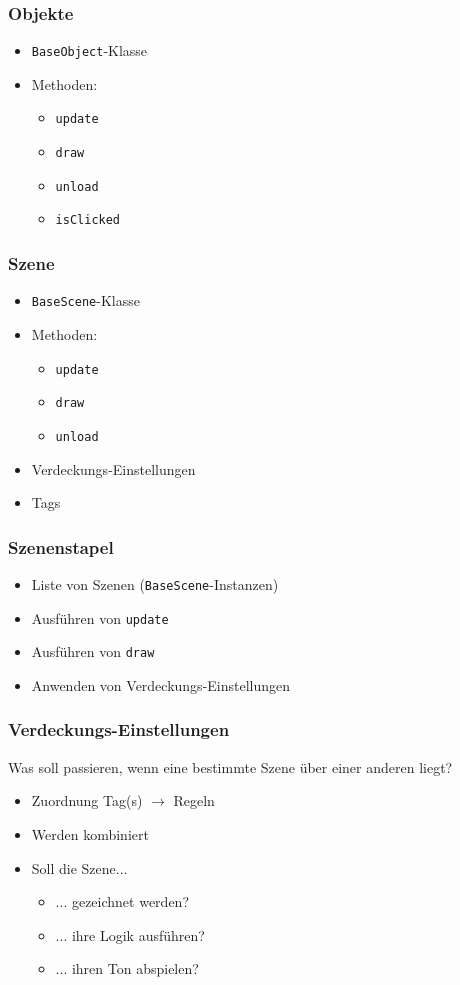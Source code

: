 \begin{frame}
	\frametitle{Objekte}
	\begin{itemize}
		\item \texttt{BaseObject}-Klasse
		\item Methoden:
		\begin{itemize}
			\item \texttt{update}
			\item \texttt{draw}
			\item \texttt{unload}
			\item \texttt{isClicked}
		\end{itemize}
	\end{itemize}
\end{frame}

\begin{frame}
	\frametitle{Szene}
	\begin{itemize}
		\item \texttt{BaseScene}-Klasse
		\item Methoden:
		\begin{itemize}
			\item \texttt{update}
			\item \texttt{draw}
			\item \texttt{unload}
		\end{itemize}
		\item Verdeckungs-Einstellungen
		\item Tags
	\end{itemize}
\end{frame}

\begin{frame}
	\frametitle{Szenenstapel}
	\begin{itemize}
		\item Liste von Szenen (\texttt{BaseScene}-Instanzen)
		\item Ausführen von \texttt{update}
		\item Ausführen von \texttt{draw}
		\item Anwenden von Verdeckungs-Einstellungen
	\end{itemize}
\end{frame}

\begin{frame}
	\frametitle{Verdeckungs-Einstellungen}
	Was soll passieren, wenn eine bestimmte Szene über einer anderen liegt?
	\vspace{0.3cm}
	
	\begin{itemize}
		\item Zuordnung Tag(s) $\rightarrow$ Regeln
		\item Werden kombiniert
		\item Soll die Szene...
		\begin{itemize}
			\item[] ... gezeichnet werden?
			\item[] ... ihre Logik ausführen?
			\item[] ... ihren Ton abspielen?
		\end{itemize}
	\end{itemize}
\end{frame}